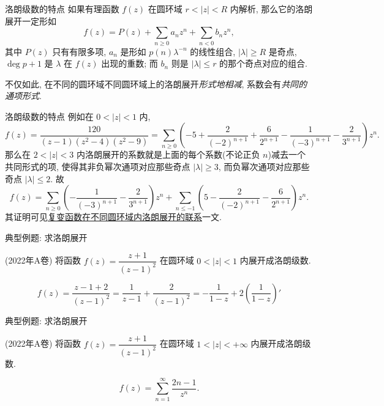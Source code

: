 \begin{frame}{洛朗级数的特点\noexer}
	\onslide<+->
	如果有理函数 $f(z)$ 在圆环域 $r<|z|<R$ 内解析, 那么它的洛朗展开一定形如
	\[f(z)=P(z)+\sum_{n\ge 0}a_n z^n+\sum_{n<0}b_n z^n,\]
	其中 $P(z)$ 只有有限多项, 
	\onslide<+->
	$a_n$ 是形如 $p(n)\lambda^{-n}$ 的线性组合, $|\lambda|\ge R$ 是奇点, $\deg p+1$ 是 $\lambda$ 在 $f(z)$ 出现的重数; 而 $b_n$ 则是 $|\lambda|\le r$ 的那个奇点对应的组合.

	\onslide<+->
	不仅如此, 在不同的圆环域不同圆环域上的洛朗展开{\itshape 形式地相减}, 系数会有\emph{共同的通项形式}.
\end{frame}


\begin{frame}{洛朗级数的特点\noexer}
	\onslide<+->
	例如在 $0<|z|<1$ 内,
	\[f(z)=\frac{120}{(z-1)(z^2-4)(z^2-9)}=\sum_{n\ge 0}\left(-5+\frac2{(-2)^{n+1}}+\frac6{2^{n+1}}-\frac1{(-3)^{n+1}}-\frac2{3^{n+1}}\right)z^n.\]
	\onslide<+->
	那么在 $2<|z|<3$ 内洛朗展开的系数就是上面的每个系数(不论正负 $n$)减去一个共同形式的项, 使得其非负幂次通项对应那些奇点 $|\lambda|\ge 3$, 而负幂次通项对应那些奇点 $|\lambda|\le2$.
	\onslide<+->
	故
	\[f(z)=\sum_{n\ge 0}\left(-\frac1{(-3)^{n+1}}-\frac2{3^{n+1}}\right)z^n+\sum_{n\le-1}\left(5-\frac2{(-2)^{n+1}}-\frac6{2^{n+1}}\right)z^n.\]
	\onslide<+->
	其证明可见\alert{\href{https://zhangshenxing.gitee.io/teaching/publications/袁志杰张神星2023 复变函数在不同圆环域内洛朗展开的联系.pdf}{复变函数在不同圆环域内洛朗展开的联系}}一文.
\end{frame}


\begin{frame}{典型例题: 求洛朗展开}
	\onslide<+->
	\begin{example}
		(2022年A卷) 将函数 $f(z)=\dfrac{z+1}{(z-1)^2}$ 在圆环域 $0<|z|<1$ 内展开成洛朗级数.
	\end{example}

	\onslide<+->
	\begin{solution}
		\[f(z)=\frac{z-1+2}{(z-1)^2}=\frac1{z-1}+\frac{2}{(z-1)^2}=-\frac1{1-z}+2\left(\frac1{1-z}\right)'\]
		\onslide<+->{因此当 $0<|z|<1$ 时,
			\[f(z)=-\sum_{n=0}^\infty z^n+2\left(\sum_{n=0}^\infty z^n\right)'=-\sum_{n=0}^\infty z^n+2\sum_{n=1}^\infty nz^{n-1}
			=\sum_{n=0}^\infty(2n+1)z^n.\]}
	\end{solution}
\end{frame}


\begin{frame}{典型例题: 求洛朗展开}
	\onslide<+->
	\begin{exercise}
		(2022年A卷) 将函数 $f(z)=\dfrac{z+1}{(z-1)^2}$ 在圆环域 $1<|z|<+\infty$ 内展开成洛朗级数.
	\end{exercise}

	\onslide<+->
	\begin{answer}
		\[f(z)=\sum_{n=1}^\infty \frac{2n-1}{z^n}.\]
	\end{answer}
\end{frame}


